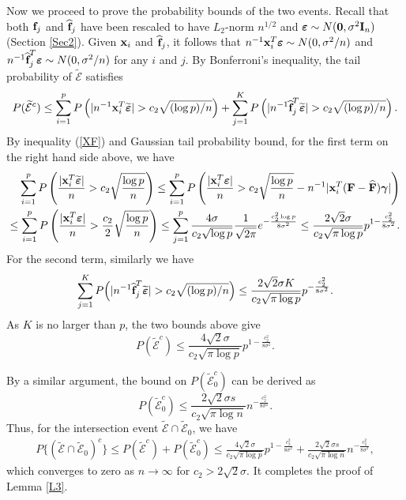\documentclass{statsoc}
\newcommand{\bff}{\mbox{\bf f}}
\newcommand{\bx}{\mbox{\bf x}}
\newcommand{\bF}{\mbox{\bf F}}
\newcommand{\bI}{\mbox{\bf I}}
\newcommand{\bveps}{\mbox{\boldmath $\varepsilon$}}
\newcommand{\bgamma}{\mbox{\boldmath $\gamma$}}
\def\t{^T}
\begin{document}
Now we proceed to prove the probability bounds of the two events. Recall that both $\bff_j$ and $\widehat{\bff}_j$ have been rescaled to have $L_2$-norm $n^{1/2}$ and $\bveps \sim N(\textbf{0},\sigma^2 \bI_n)$ (Section \ref{Sec2}). Given $\bx_i$ and $\widehat{\bff}_j$, it follows that $n^{-1} \bx_i\t \bveps \sim N(0, \sigma^2 /n)$ and $n^{-1} \widehat{\bff}_j\t \bveps \sim N(0, \sigma^2/n)$ for any $i$ and $j$. By Bonferroni's inequality, the tail probability of $\widetilde{\mathcal{E}}$ satisfies %
\begin{align*}
P(\widetilde{\mathcal{E}}^c) \leq \sum^{p}_{i = 1} P \left(|n^{-1} \bx_i\t \widetilde{\bveps}| > c_2 \sqrt{(\log p)/n} \right) + \sum^{K}_{j = 1} P \left(|n^{-1} \widehat{\bff}_j\t \widetilde{\bveps}| > c_2 \sqrt{(\log p)/n} \right).
\end{align*}
By inequality (\ref{XF}) and Gaussian tail probability bound, for the first term on the right hand side above, we have
\begin{align*}
\sum^{p}_{i = 1} P \left( \frac{|\bx_i\t \widetilde{\bveps}|}{n} > c_2 \sqrt{\frac{\log p}{n}} \right) \leq \sum^{p}_{i = 1} P \left(\frac{|\bx_i\t \bveps|}{n} > c_2 \sqrt{\frac{\log p}{n}} - n^{-1} |\bx_i\t (\bF - \widehat{\bF}) \bgamma| \right)\\
\leq \sum^{p}_{i = 1} P \left(\frac{|\bx_i\t \bveps|}{n} > \frac{c_2}{2} \sqrt{\frac{\log p}{n}} \right)
\leq \sum^{p}_{j = 1} \frac{4 \sigma}{c_2 \sqrt{\log p}} \frac{1}{\sqrt{2 \pi}} e^{-\frac{c_2^2 \log p}{8 \sigma^2}} \leq \frac{2\sqrt{2}\sigma}{c_2 \sqrt{\pi \log p}} p^{1 - \frac{c_2^2}{8 \sigma^2}}.
\end{align*}
For the second term, similarly we have
\begin{align*}
\sum^{K}_{j = 1} P \Big (|n^{-1} \widehat{\bff}_j\t \widetilde{\bveps}| > c_2 \sqrt{(\log p)/n} \Big ) \leq \frac{2\sqrt{2}\sigma K}{c_2 \sqrt{\pi \log p}} p^{-\frac{c_2^2}{8 \sigma^2}}.
\end{align*}
As $K$ is no larger than $p$, the two bounds above give
\[P(\widetilde{\mathcal{E}}^c) \leq \frac{4\sqrt{2}\sigma}{c_2 \sqrt{\pi \log p}} p^{1 - \frac{c_2^2}{8 \sigma^2}}.\]

By a similar argument, the bound on $P(\widetilde{\mathcal{E}}_0^c)$ can be derived as
\[P(\widetilde{\mathcal{E}}_0^c) \leq  \frac{2\sqrt{2}\sigma s}{c_2 \sqrt{\pi \log n}} n^{-\frac{c_2^2}{8 \sigma^2}}.\]
Thus, for the intersection event $\widetilde{\mathcal{E}} \cap \widetilde{\mathcal{E}}_0$, we have
\begin{align*}
P\{(\widetilde{\mathcal{E}} \cap \widetilde{\mathcal{E}}_0)^c\} \leq P(\tilde{\mathcal{E}}^c) + P(\widetilde{\mathcal{E}}_0^c) \leq \frac{4\sqrt{2}\sigma}{c_2 \sqrt{\pi \log p}} p^{1 - \frac{c_2^2}{8 \sigma^2}} + \frac{2\sqrt{2}\sigma s}{c_2 \sqrt{\pi \log n}} n^{-\frac{c_2^2}{8 \sigma^2}},
\end{align*}
which converges to zero as $n\to \infty$ for $c_2 > 2\sqrt{2} \sigma$. It completes the proof of Lemma \ref{L3}.
\end{document}
